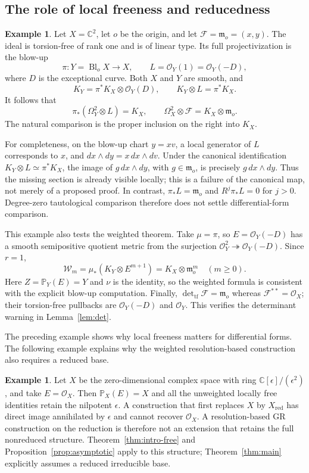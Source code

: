 \documentclass[11pt,reqno]{amsart}
\numberwithin{equation}{section}
\theoremstyle{definition}
\newtheorem{example}[theorem]{Example}
\theoremstyle{remark}
\newcommand{\OO}{\mathcal O}
\newcommand{\FF}{\mathcal F}
\newcommand{\WW}{\mathcal W}
\newcommand{\PP}{\mathbb P}
\newcommand{\CC}{\mathbb C}
\newcommand{\tf}{\mathrm{tf}}
\begin{document}
\subsection{The role of local freeness and reducedness}
\begin{example}\label{ex:blowup}
Let $X=\CC^2$, let $o$ be the origin, and let $\FF=\mathfrak m_o=(x,y)$. The ideal is torsion-free of rank one and is of linear type. Its full projectivization is the blow-up
\[
 \pi:Y=\operatorname{Bl}_oX\to X,
 \qquad L=\OO_Y(1)=\OO_Y(-D),
\]
where $D$ is the exceptional curve. Both $X$ and $Y$ are smooth, and
\[
 K_Y=\pi^*K_X\otimes\OO_Y(D),\qquad
 K_Y\otimes L=\pi^*K_X.
\]
It follows that
\begin{equation}\label{eq:counter-form}
 \pi_*(\Omega_Y^2\otimes L)=K_X,
 \qquad\Omega_X^2\otimes\FF=K_X\otimes\mathfrak m_o.
\end{equation}
The natural comparison is the proper inclusion on the right into $K_X$.

For completeness, on the blow-up chart $y=xv$, a local generator of $L$ corresponds to $x$, and $dx\wedge dy=x\,dx\wedge dv$. Under the canonical identification $K_Y\otimes L\simeq\pi^*K_X$, the image of $g\,dx\wedge dy$, with $g\in\mathfrak m_o$, is precisely $g\,dx\wedge dy$. Thus the missing section is already visible locally; this is a failure of the canonical map, not merely of a proposed proof. In contrast, $\pi_*L=\mathfrak m_o$ and $R^j\pi_*L=0$ for $j>0$. Degree-zero tautological comparison therefore does not settle differential-form comparison.

This example also tests the weighted theorem. Take $\mu=\pi$, so $E=\OO_Y(-D)$ has a smooth semipositive quotient metric from the surjection $\OO_Y^2\twoheadrightarrow\OO_Y(-D)$. Since $r=1$,
\[
 \WW_m=\mu_*(K_Y\otimes E^{m+1})
       =K_X\otimes\mathfrak m_o^m\quad(m\geq0).
\]
Here $Z=\PP_Y(E)=Y$ and $\nu$ is the identity, so the weighted formula is consistent with the explicit blow-up computation. Finally, $\det_{\tf}\FF=\mathfrak m_o$ whereas $\FF^{**}=\OO_X$; their torsion-free pullbacks are $\OO_Y(-D)$ and $\OO_Y$. This verifies the determinant warning in Lemma~\ref{lem:det}.
\end{example}

The preceding example shows why local freeness matters for differential forms. The following example explains why the weighted resolution-based construction also requires a reduced base.
\begin{example}
Let $X$ be the zero-dimensional complex space with ring $\CC[\epsilon]/(\epsilon^2)$, and take $E=\OO_X$. Then $\PP_X(E)=X$ and all the unweighted locally free identities retain the nilpotent $\epsilon$. A construction that first replaces $X$ by $X_{\mathrm{red}}$ has direct image annihilated by $\epsilon$ and cannot recover $\OO_X$. A resolution-based GR construction on the reduction is therefore not an extension that retains the full nonreduced structure. Theorem~\ref{thm:intro-free} and Proposition~\ref{prop:asymptotic} apply to this structure; Theorem~\ref{thm:main} explicitly assumes a reduced irreducible base.
\end{example}
\end{document}
